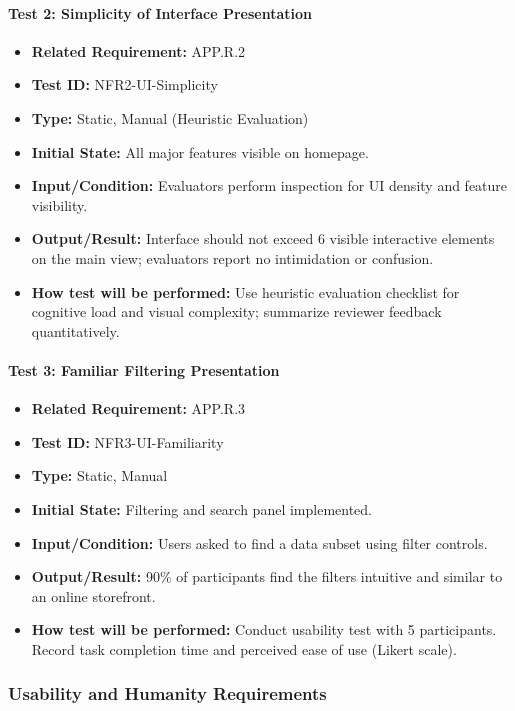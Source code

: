 \documentclass[12pt, titlepage]{article}
\begin{document}
\paragraph{Test 2: Simplicity of Interface Presentation}
\begin{itemize}
    \item \textbf{Related Requirement:} APP.R.2
    \item \textbf{Test ID:} NFR2-UI-Simplicity
    \item \textbf{Type:} Static, Manual (Heuristic Evaluation)
    \item \textbf{Initial State:} All major features visible on homepage.
    \item \textbf{Input/Condition:} Evaluators perform inspection for UI density and feature visibility.
    \item \textbf{Output/Result:} Interface should not exceed 6 visible interactive elements on the main view; evaluators report no intimidation or confusion.
    \item \textbf{How test will be performed:} Use heuristic evaluation checklist for cognitive load and visual complexity; summarize reviewer feedback quantitatively.
\end{itemize}

\paragraph{Test 3: Familiar Filtering Presentation}
\begin{itemize}
    \item \textbf{Related Requirement:} APP.R.3
    \item \textbf{Test ID:} NFR3-UI-Familiarity
    \item \textbf{Type:} Static, Manual
    \item \textbf{Initial State:} Filtering and search panel implemented.
    \item \textbf{Input/Condition:} Users asked to find a data subset using filter controls.
    \item \textbf{Output/Result:} 90\% of participants find the filters intuitive and similar to an online storefront.
    \item \textbf{How test will be performed:} Conduct usability test with 5 participants. Record task completion time and perceived ease of use (Likert scale).
\end{itemize}

\subsubsection{Usability and Humanity Requirements}
\end{document}
